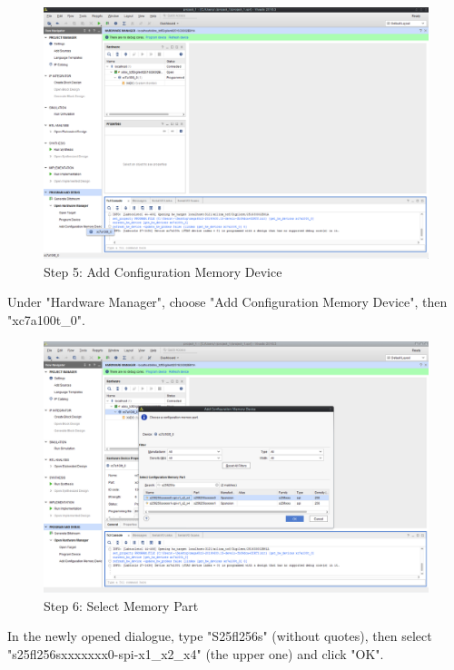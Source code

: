 \begin{figure}
  \includegraphics[width=\linewidth]{images/vivado05.png}
  \caption{Step 5: Add Configuration Memory Device}
  \label{fig:vivado05}
\end{figure}

Under "Hardware Manager", choose "Add Configuration Memory Device", then "xc7a100t\_0".

\begin{figure}
  \includegraphics[width=\linewidth]{images/vivado06.png}
  \caption{Step 6: Select Memory Part}
  \label{fig:vivado06}
\end{figure}

In the newly opened dialogue, type "S25fl256s" (without quotes), then select "s25fl256sxxxxxxx0-spi-x1\_x2\_x4" (the upper one) and click "OK".

